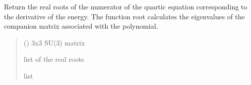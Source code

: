 \documentclass[letterpaper,10pt,english]{sphinxmanual}
\begin{document}

\begin{fulllineitems}
\label{\detokenize{numerical_reject:numerical_reject.real_roots}}
\pysigstartsignatures
\pysiglinewithargsret
{}
{}
{}
\pysigstopsignatures
\sphinxAtStartPar
Return the real roots of the numerator of the quartic equation corresponding to the derivative of the energy. The function root calculates the eigenvalues of the companion matrix associated with the polynomial.
\begin{quote}\begin{description}
\sphinxAtStartPar
{} () \textendash{} 3x3 SU(3) matrix

\sphinxAtStartPar
list of the real roots

\sphinxAtStartPar
list

\end{description}\end{quote}

\end{fulllineitems}

\end{document}
